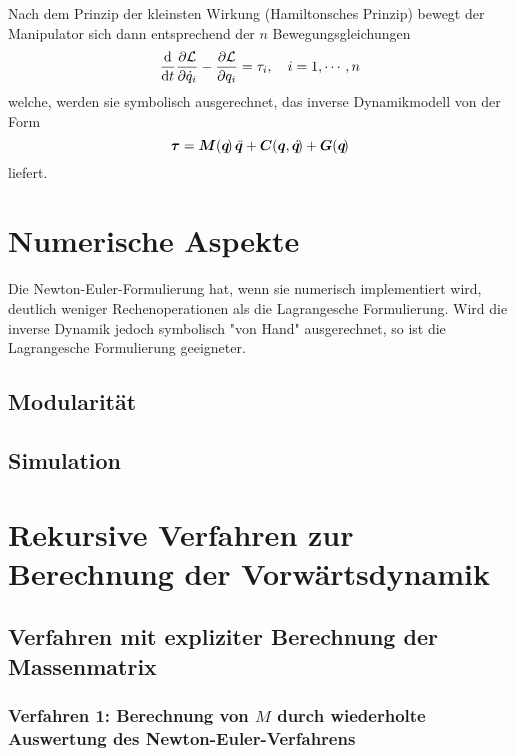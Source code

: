 			Nach dem Prinzip der kleinsten Wirkung (Hamiltonsches Prinzip) bewegt der Manipulator sich dann entsprechend der \(n\) Bewegungsgleichungen
			\begin{equation*}
				\dv{t} \frac{\partial \mathcal{L}}{\partial \dot{q}_i} - \frac{\partial \mathcal{L}}{\partial q_i} = \tau_i,\quad i = 1, \cdots, n
			\end{equation*}
			welche, werden sie symbolisch ausgerechnet, das inverse Dynamikmodell von der Form
			\begin{equation*}
				\bm{\tau} = \bm{M}(\bm{q}\!)\, \ddot{\bm{q}} + \bm{C}(\bm{q}, \dot{\bm{q}}\!) + \bm{G}(\bm{q}\!)
			\end{equation*}
			liefert.

	\section{Numerische Aspekte}
		Die Newton-Euler-Formulierung hat, wenn sie numerisch implementiert wird, deutlich weniger Rechenoperationen als die Lagrangesche Formulierung. Wird die inverse Dynamik jedoch symbolisch "von Hand" ausgerechnet, so ist die Lagrangesche Formulierung geeigneter.

		\subsection{Modularität} %

		\subsection{Simulation} %

	\section{Rekursive Verfahren zur Berechnung der Vorwärtsdynamik} %

		\subsection{Verfahren mit expliziter Berechnung der Massenmatrix} %

			\subsubsection{Verfahren 1: Berechnung von \(M\) durch wiederholte Auswertung des Newton-Euler-Verfahrens} %

